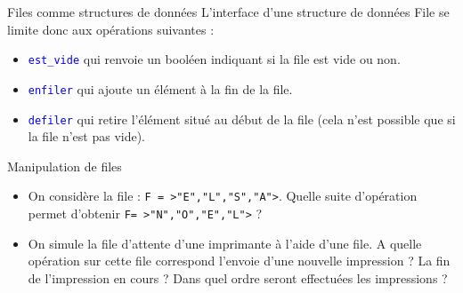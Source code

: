 \documentclass[10pt]{beamer}
\begin{document}
\begin{frame}{\Ctitle}{\stitle}
	\begin{alertblock}{Files comme structures de données}
		L'interface d'une structure de données File se limite donc aux opérations suivantes :
		\begin{itemize}
			\item<2-> \textcolor{blue}{\tt est\_vide} qui renvoie un booléen indiquant si la file est vide ou non.
			\item<3-> \textcolor{blue}{\tt enfiler} qui ajoute un élément à la fin de la file.
			\item<4-> \textcolor{blue}{\tt defiler} qui retire l'élément situé au début de la file (cela n'est possible que si la file n'est pas vide).
		\end{itemize}
	\end{alertblock}
\end{frame}

\begin{frame}{\Ctitle}{\stitle}
	\begin{exampleblock}{Manipulation de files}
		\begin{itemize}
			\item<2-> On considère la file : {\tt F = >"E","L","S","A">}. Quelle suite d'opération permet d'obtenir {\tt F= >"N","O","E","L">} ?
			\item<3-> On simule la file d'attente d'une imprimante à l'aide d'une file. A quelle opération sur cette file correspond l'envoie d'une nouvelle impression ? La fin de l'impression en cours ? Dans quel ordre seront effectuées les impressions ?
		\end{itemize}
	\end{exampleblock}
\end{frame}
\end{document}
